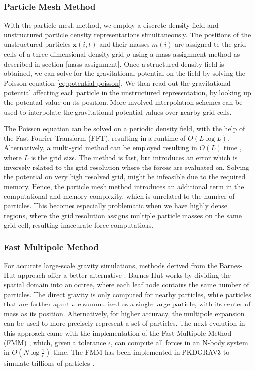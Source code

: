 \documentclass{article}
\begin{document}
\subsubsection{Particle Mesh Method}
\label{pm}
With the particle mesh method, we employ a discrete density field and unstructured particle density representations simultaneously. The positions of the unstructured particles $\mathbf{x}(i, t)$ and their masses $m(i)$ are assigned to the grid cells of a three-dimensional density grid $\rho$ using a mass assignment method as described in section \ref{mass-assignment}. Once a structured density field is obtained, we can solve for the gravitational potential on the field by solving the Poisson equation \ref{eq:potential-poisson}. We then read out the gravitational potential affecting each particle in the unstructured representation, by looking up the potential value on its position. More involved interpolation schemes can be used to interpolate the gravitational potential values over nearby grid cells.

The Poisson equation can be solved on a periodic density field, with the help of the Fast Fourier Transform (FFT), resulting in a runtime of $O(L \log L)$. Alternatively, a multi-grid method can be employed resulting in $O(L)$ time \citep{demmel1996solving, mccormick1987multigrid}, where $L$ is the grid size. The method is fast, but introduces an error which is inversely related to the grid resolution where the forces are evaluated on. Solving the potential on very high resolved grid, might be infeasible due to the required memory. Hence, the particle mesh method introduces an additional term in the computational and memory complexity, which is unrelated to the number of particles. This becomes especially problematic when we have highly dense regions, where the grid resolution assigns multiple particle masses on the same grid cell, resulting inaccurate force computations.

\subsubsection{Fast Multipole Method}
\label{fmm}

For accurate large-scale gravity simulations, methods derived from the Barnes-Hut approach offer a better alternative \citep{barnes1986hierarchical}. Barnes-Hut works by dividing the spatial domain into an octree, where each leaf node contains the same number of particles. The direct gravity is only computed for nearby particles, while particles that are farther apart are summarized as a single large particle, with its center of mass as its position. Alternatively, for higher accuracy, the multipole expansion can be used to more precisely represent a set of particles. The next evolution in this approach came with the implementation of the Fast Multipole Method (FMM) \citep{rokhlin1985rapid}, which, given a tolerance $\epsilon$, can compute all forces in an N-body system in $O(N \log \frac{1}{\epsilon})$ time. The FMM has been implemented in PKDGRAV3 to simulate trillions of particles \citep{potter2017pkdgrav3}.
\end{document}
